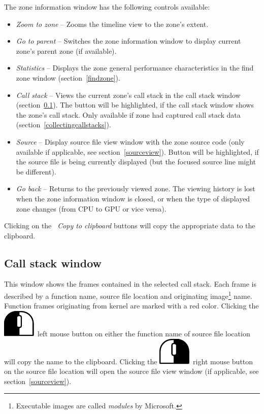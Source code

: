 \documentclass[hidelinks,titlepage,a4paper]{article}
\newcommand{\LMB}{\includegraphics[height=.8\baselineskip]{icons/lmb}}
\newcommand{\RMB}{\includegraphics[height=.8\baselineskip]{icons/rmb}}
\begin{document}
The zone information window has the following controls available:

\begin{itemize}
\item \emph{\faMicroscope{} Zoom to zone} -- Zooms the timeline view to the zone's extent.
\item \emph{\faArrowUp{} Go to parent} -- Switches the zone information window to display current zone's parent zone (if available).
\item \emph{\faChartBar{} Statistics} -- Displays the zone general performance characteristics in the find zone window (section~\ref{findzone}).
\item \emph{\faAlignJustify{} Call stack} -- Views the current zone's call stack in the call stack window (section~\ref{callstackwindow}). The button will be highlighted, if the call stack window shows the zone's call stack. Only available if zone had captured call stack data (section~\ref{collectingcallstacks}).
\item \emph{\faFile*{} Source} -- Display source file view window with the zone source code (only available if applicable, see section~\ref{sourceview}). Button will be highlighted, if the source file is being currently displayed (but the focused source line might be different).
\item \emph{\faArrowLeft{} Go back} -- Returns to the previously viewed zone. The viewing history is lost when the zone information window is closed, or when the type of displayed zone changes (from CPU to GPU or vice versa).
\end{itemize}

Clicking on the \emph{\faClipboard{}~Copy to clipboard} buttons will copy the appropriate data to the clipboard.

\subsection{Call stack window}
\label{callstackwindow}

This window shows the frames contained in the selected call stack. Each frame is described by a function name, source file location and originating image\footnote{Executable images are called \emph{modules} by Microsoft.} name. Function frames originating from kernel are marked with a red color. Clicking the \LMB{}~left mouse button on either the function name of source file location will copy the name to the clipboard. Clicking the \RMB{}~right mouse button on the source file location will open the source file view window (if applicable, see section~\ref{sourceview}).
\end{document}
